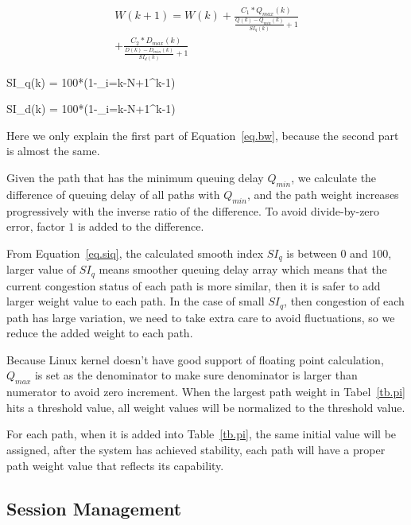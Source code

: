 \begin{eqnarray}
\label{eq.bw}
W(k+1) = W(k) + \frac{C_1*Q_{max}(k)}{\frac{Q(k)-Q_{min}(k)}{SI_q(k)}+1} \nonumber \\
\left.		  + \frac{C_2*D_{max}(k)}{\frac{D(k)-D_{min}(k)}{SI_d(k)}+1}\right. 
\end{eqnarray}

\be
\label{eq.siq}
SI_q(k) = 100*(1-\sum_{i=k-N+1}^{k-1})
\ee

\be
\label{eq.sid}
SI_d(k) = 100*(1-\sum_{i=k-N+1}^{k-1})
\ee

Here we only explain the first part of Equation~\ref{eq.bw}, because the second part is almost the same.

Given the path that has the minimum queuing delay $Q_{min}$, we calculate the difference of queuing delay of all paths with $Q_{min}$, and the path weight increases progressively with the inverse ratio of the difference. To avoid divide-by-zero error, factor $1$ is added to the difference.

From Equation~\ref{eq.siq}, the calculated smooth index $SI_q$ is between $0$ and $100$, larger value of $SI_q$ means smoother queuing delay array which means that the current congestion status of each path is more similar, then it is safer to add larger weight value to each path. In the case of small $SI_q$, then congestion of each path has large variation, we need to take extra care to avoid fluctuations, so we reduce the added weight to each path.

Because Linux kernel doesn\textquoteright t have good support of floating point calculation, $Q_{max}$ is set as the denominator to make sure denominator is larger than numerator to avoid zero increment. When the largest path weight in Tabel~\ref{tb.pi} hits a threshold value, all weight values will be normalized to the threshold value.

For each path, when it is added into Table~\ref{tb.pi}, the same initial value will be assigned, after the system has achieved stability, each path will have a proper path weight value that reflects its capability. 

%


\subsection{Session Management}
\label{sec:session}

